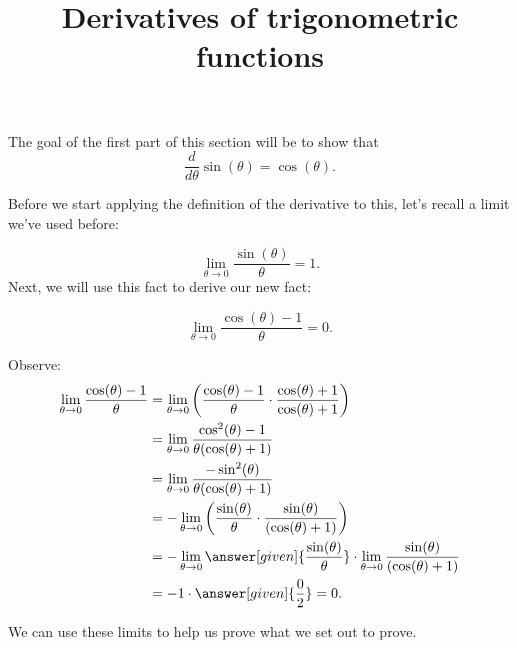 \documentclass{ximera}
\title{Derivatives of trigonometric functions}
\begin{document}
\begin{abstract}
\end{abstract}
\maketitle


The goal of the first part of this section will be to show that
\[
\frac{d}{d\theta}\sin(\theta)=\cos(\theta).
\]

Before we start applying the definition of the derivative to this, let's recall a limit we've used before:

\[
\lim_{\theta\to 0} \frac{\sin(\theta)}{\theta} = 1. %
\]
Next, we will use this fact to derive our new fact:
\begin{example}
  \[
\lim_{\theta\to 0}\frac{\cos(\theta)-1}{\theta} = 0.
  \]
  \begin{explanation}
Observe:
\begin{align*}
\lim_{\theta\to 0}\frac{\cos(\theta)-1}{\theta} &= \lim_{\theta\to 0}\left(\frac{\cos(\theta)-1}{\theta}\cdot\frac{\cos(\theta)+1}{\cos(\theta)+1}\right)\\
&=\lim_{\theta\to 0}\frac{\cos^2(\theta)-1}{\theta(\cos(\theta)+1)}\\
&=\lim_{\theta\to 0}\frac{-\sin^2(\theta)}{\theta(\cos(\theta)+1)}\\
&=-\lim_{\theta\to 0}\left(\frac{\sin(\theta)}{\theta}\cdot\frac{\sin(\theta)}{(\cos(\theta)+1)}\right)\\
&=-\lim_{\theta\to 0}\answer[given]{\frac{\sin(\theta)}{\theta}} \cdot \lim_{\theta\to 0}\frac{\sin(\theta)}{(\cos(\theta)+1)}\\
&= -1 \cdot \answer[given]{\frac{0}{2}} = 0.
\end{align*}
  \end{explanation}
\end{example}

We can use these limits to help us prove what we set out to prove.
\end{document}
